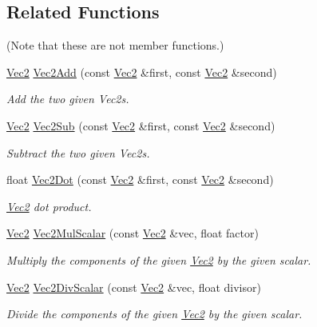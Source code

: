 \subsection*{Related Functions}
(Note that these are not member functions.) {\bf }\par
\begin{DoxyCompactItemize}
\item 
\hyperlink{classgofxmath_1_1_vec2}{Vec2} \hyperlink{group___s_i_s_d_vec_math_gac9d2c898c69c771b9d9993a4c4f1a146}{Vec2\+Add} (const \hyperlink{classgofxmath_1_1_vec2}{Vec2} \&first, const \hyperlink{classgofxmath_1_1_vec2}{Vec2} \&second)
\begin{DoxyCompactList}\small\item\em Add the two given Vec2s. \end{DoxyCompactList}\item 
\hyperlink{classgofxmath_1_1_vec2}{Vec2} \hyperlink{group___s_i_s_d_vec_math_gabc910528ba2f4f4c3b69bf432e5c7731}{Vec2\+Sub} (const \hyperlink{classgofxmath_1_1_vec2}{Vec2} \&first, const \hyperlink{classgofxmath_1_1_vec2}{Vec2} \&second)
\begin{DoxyCompactList}\small\item\em Subtract the two given Vec2s. \end{DoxyCompactList}\item 
float \hyperlink{group___s_i_s_d_vec_math_gaf722c71a1e9ef7bf97d9489b1cf561e0}{Vec2\+Dot} (const \hyperlink{classgofxmath_1_1_vec2}{Vec2} \&first, const \hyperlink{classgofxmath_1_1_vec2}{Vec2} \&second)
\begin{DoxyCompactList}\small\item\em \hyperlink{classgofxmath_1_1_vec2}{Vec2} dot product. \end{DoxyCompactList}\item 
\hyperlink{classgofxmath_1_1_vec2}{Vec2} \hyperlink{group___s_i_s_d_vec_math_ga8e4fd4586284706a28625b0fca6c85e7}{Vec2\+Mul\+Scalar} (const \hyperlink{classgofxmath_1_1_vec2}{Vec2} \&vec, float factor)
\begin{DoxyCompactList}\small\item\em Multiply the components of the given \hyperlink{classgofxmath_1_1_vec2}{Vec2} by the given scalar. \end{DoxyCompactList}\item 
\hyperlink{classgofxmath_1_1_vec2}{Vec2} \hyperlink{group___s_i_s_d_vec_math_ga8686be4c3f0ee27b05363661fb75a228}{Vec2\+Div\+Scalar} (const \hyperlink{classgofxmath_1_1_vec2}{Vec2} \&vec, float divisor)
\begin{DoxyCompactList}\small\item\em Divide the components of the given \hyperlink{classgofxmath_1_1_vec2}{Vec2} by the given scalar. \end{DoxyCompactList}\item 

\end{DoxyCompactItemize}
